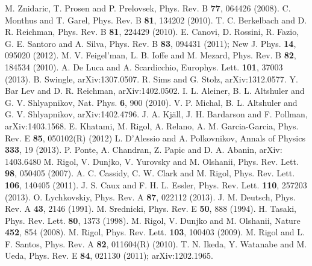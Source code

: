 \documentclass[amsmath,onecolumn, superscriptaddress,preprint,aps]{revtex4}
\begin{document}
\begin{thebibliography}{99}
M. Znidaric, T. Prosen and P. Prelovsek, Phys. Rev. B {\bf 77}, 064426 (2008).
C. Monthus and T. Garel, Phys. Rev. B {\bf 81}, 134202 (2010).
T. C. Berkelbach and D. R. Reichman, Phys. Rev. B {\bf 81}, 224429 (2010).
E. Canovi, D. Rossini, R. Fazio, G. E. Santoro and A. Silva, Phys. Rev. B {\bf 83}, 094431 (2011); New J. Phys. {\bf 14}, 095020 (2012).
M. V. Feigel'man, L. B. Ioffe and M. Mezard, Phys. Rev. B {\bf 82}, 184534 (2010).
A. De Luca and A. Scardicchio, Europhys. Lett. {\bf 101}, 37003 (2013).
B. Swingle, arXiv:1307.0507.
R. Sims and G. Stolz, arXiv:1312.0577.
Y. Bar Lev and D. R. Reichman, arXiv:1402.0502.
I. L. Aleiner, B. L. Altshuler and G. V. Shlyapnikov, Nat. Phys. {\bf 6}, 900 (2010).
V. P. Michal, B. L. Altshuler and G. V. Shlyapnikov, arXiv:1402.4796.
J. A. Kj\"all, J. H. Bardarson and F. Pollman, arXiv:1403.1568.
E. Khatami, M. Rigol, A. Relano, A. M. Garcia-Garcia, Phys. Rev. E {\bf 85}, 050102(R) (2012)
L. D'Alessio and A. Polkovnikov, Annals of Physics {\bf 333}, 19 (2013).
P. Ponte, A. Chandran, Z. Papic and D. A. Abanin, arXiv: 1403.6480
M. Rigol, V. Dunjko, V. Yurovsky and M. Olshanii, Phys. Rev. Lett. {\bf 98}, 050405 (2007).
A. C. Cassidy, C. W. Clark and M. Rigol, Phys. Rev. Lett. {\bf 106}, 140405 (2011).
J. S. Caux and F. H. L. Essler, Phys. Rev. Lett. {\bf 110}, 257203 (2013).
O. Lychkovskiy, Phys. Rev. A {\bf 87}, 022112 (2013).
J. M. Deutsch, Phys. Rev. A {\bf 43}, 2146 (1991).
M. Srednicki, Phys. Rev. E {\bf 50}, 888 (1994).
H. Tasaki, Phys. Rev. Lett. {\bf 80}, 1373 (1998).
M. Rigol, V. Dunjko and M. Olshanii, Nature {\bf 452}, 854 (2008).
M. Rigol, Phys. Rev. Lett. {\bf 103}, 100403 (2009).
M. Rigol and L. F. Santos, Phys. Rev. A {\bf 82}, 011604(R) (2010).
T. N. Ikeda, Y. Watanabe and M. Ueda, Phys. Rev. E {\bf 84}, 021130 (2011); arXiv:1202.1965.

\end{thebibliography}
\end{document}

